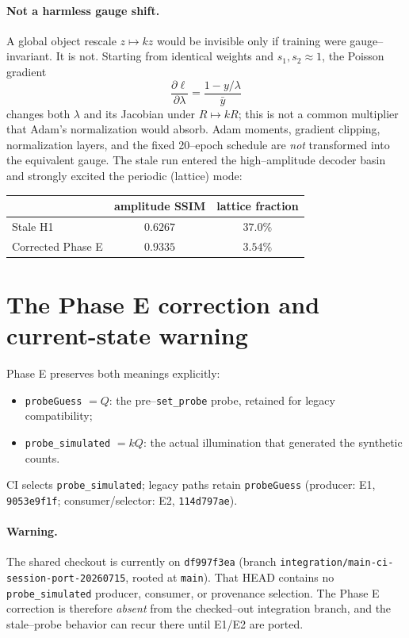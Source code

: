 \documentclass[11pt]{article}
\newcommand{\code}[1]{\texttt{#1}}
\begin{document}
\paragraph{Not a harmless gauge shift.} A global object rescale $z \mapsto kz$
would be invisible only if training were gauge--invariant. It is not. Starting
from identical weights and $s_1,s_2\approx 1$, the Poisson gradient
\begin{equation}
\frac{\partial \ell}{\partial \lambda}
= \frac{1 - y/\lambda}{\bar y}
\end{equation}
changes both $\lambda$ and its Jacobian under $R\mapsto kR$; this is not a
common multiplier that Adam's normalization would absorb. Adam moments,
gradient clipping, normalization layers, and the fixed 20--epoch schedule are
\emph{not} transformed into the equivalent gauge. The stale run entered the
high--amplitude decoder basin and strongly excited the periodic (lattice) mode:
\begin{center}
\begin{tabular}{lcc}
\toprule
& amplitude SSIM & lattice fraction \\
\midrule
Stale H1        & $0.6267$ & $37.0\%$ \\
Corrected Phase E & $0.9335$ & $3.54\%$ \\
\bottomrule
\end{tabular}
\end{center}

\section{The Phase E correction and current-state warning}

Phase E preserves both meanings explicitly:
\begin{itemize}
\item \code{probeGuess} $= Q$: the pre--\code{set\_probe} probe, retained for
legacy compatibility;
\item \code{probe\_simulated} $= kQ$: the actual illumination that generated the
synthetic counts.
\end{itemize}
CI selects \code{probe\_simulated}; legacy paths retain \code{probeGuess}
(producer: E1, \code{9053e9f1f}; consumer/selector: E2, \code{114d797ae}).

\paragraph{Warning.} The shared checkout is currently on \code{df997f3ea}
(branch \code{integration/main-ci-session-port-20260715}, rooted at
\code{main}). That HEAD contains no \code{probe\_simulated} producer, consumer,
or provenance selection. The Phase E correction is therefore \emph{absent} from
the checked--out integration branch, and the stale--probe behavior can recur
there until E1/E2 are ported.
\end{document}
